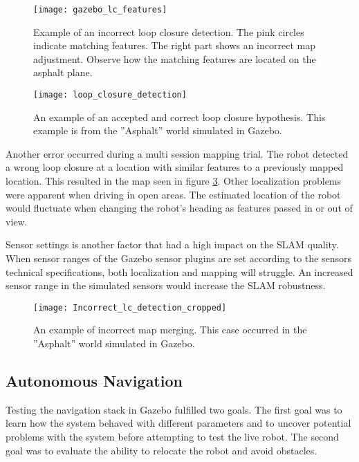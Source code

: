 \begin{figure}[h]
	\centering
	\texttt{[image: gazebo\_lc\_features]}
	\caption{Example of an incorrect loop closure detection. The pink circles indicate matching features. The right part shows an incorrect map adjustment. Observe how the matching features are located on the asphalt plane.}
	\label{fig:gazebo_lc_features}
\end{figure}

\begin{figure}[H]
	\centering
	\texttt{[image: loop\_closure\_detection]}
	\caption{An example of an accepted and correct loop closure hypothesis. This example is from the ''Asphalt'' world simulated in Gazebo.}
	\label{fig:loop_closure_detection}
\end{figure}

Another error occurred during a multi session mapping trial. The robot detected a wrong loop closure at a location with similar features to a previously mapped location. This resulted in the map seen in figure \ref{fig:Incorrect_lc_detection}. Other localization problems were apparent when driving in open areas. The estimated location of the robot would fluctuate when changing the robot's heading as features passed in or out of view.

Sensor settings is another factor that had a high impact on the \ac{SLAM} quality. When sensor ranges of the Gazebo sensor plugins are set according to the sensors technical specifications, both localization and mapping will struggle. An increased sensor range in the simulated sensors would increase the \ac{SLAM} robustness.

\begin{figure}[h]
	\centering
	\texttt{[image: Incorrect\_lc\_detection\_cropped]}
	\caption{An example of incorrect map merging. This case occurred in the ''Asphalt'' world simulated in Gazebo.}
	\label{fig:Incorrect_lc_detection}
\end{figure}


\subsection{Autonomous Navigation}

Testing the navigation stack in Gazebo fulfilled two goals. The first goal was to learn how the system behaved with different parameters and to uncover potential problems with the system before attempting to test the live robot. The second goal was to evaluate the ability to relocate the robot and avoid obstacles. 

